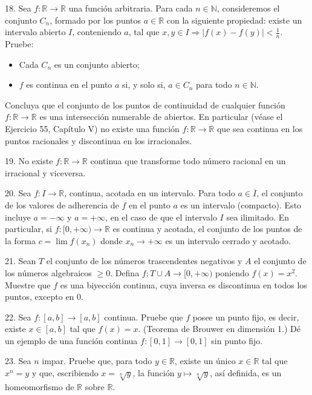 \documentclass[12pt,oneside]{book}
\begin{document}
18. Sea \(f: \mathbb{R} \to \mathbb{R}\) una función arbitraria. Para cada \(n \in \mathbb{N}\), consideremos el conjunto \(C_n\), formado por los puntos \(a \in \mathbb{R}\) con la siguiente propiedad: existe un intervalo abierto \(I\), conteniendo \(a\), tal que \(x, y \in I \Rightarrow |f(x) - f(y)| < \frac{1}{n}\). Pruebe:

\begin{itemize}
    \item[1.] Cada \(C_n\) es un conjunto abierto;
    \item[2.] \(f\) es continua en el punto \(a\) si, y solo si, \(a \in C_n\) para todo \(n \in \mathbb{N}\).
\end{itemize}

Concluya que el conjunto de los puntos de continuidad de cualquier función \(f: \mathbb{R} \to \mathbb{R}\) es una intersección numerable de abiertos. En particular (véase el Ejercicio 55, Capítulo V) no existe una función \(f: \mathbb{R} \to \mathbb{R}\) que sea continua en los puntos racionales y discontinua en los irracionales.

19. No existe \(f: \mathbb{R} \to \mathbb{R}\) continua que transforme todo número racional en un irracional y viceversa.

20. Sea \(f: I \to \mathbb{R}\), continua, acotada en un intervalo. Para todo \(a \in \overline{I}\), el conjunto de los valores de adherencia de \(f\) en el punto \(a\) es un intervalo (compacto). Esto incluye \(a = -\infty\) y \(a = +\infty\), en el caso de que el intervalo \(I\) sea ilimitado. En particular, si \(f: [0, +\infty) \to \mathbb{R}\) es continua y acotada, el conjunto de los puntos de la forma \(c = \lim f(x_n)\) donde \(x_n \to +\infty\) es un intervalo cerrado y acotado.

21. Sean \(T\) el conjunto de los números trascendentes negativos y \(A\) el conjunto de los números algebraicos \(\geq 0\). Defina \(f: T \cup A \to [0, +\infty)\) poniendo \(f(x) = x^2\). Muestre que \(f\) es una biyección continua, cuya inversa es discontinua en todos los puntos, excepto en \(0\).

22. Sea \(f: [a, b] \to [a, b]\) continua. Pruebe que \(f\) posee un punto fijo, es decir, existe \(x \in [a, b]\) tal que \(f(x) = x\). (Teorema de Brouwer en dimensión 1.) Dé un ejemplo de una función continua \(f: [0, 1] \to [0, 1]\) sin punto fijo.

23. Sea \(n\) impar. Pruebe que, para todo \(y \in \mathbb{R}\), existe un único \(x \in \mathbb{R}\) tal que \(x^n = y\) y que, escribiendo \(x = \sqrt[n]{y}\), la función \(y \mapsto \sqrt[n]{y}\), así definida, es un homeomorfismo de \(\mathbb{R}\) sobre \(\mathbb{R}\).
\end{document}
